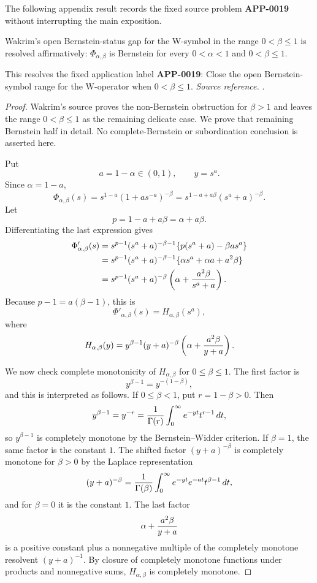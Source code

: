 The following appendix result records the fixed source problem \textbf{APP-0019} without interrupting the main exposition.
\begin{corollary}
\label{res:wakrim-w-operator-bf-gap-solved}
Wakrim's open Bernstein-status gap for the W-symbol in the range \(0<\beta\le1\) is resolved affirmatively: \(\Phi_{\alpha,\beta}\) is Bernstein for every \(0<\alpha<1\) and \(0<\beta\le1\).

This resolves the fixed application label \textbf{APP-0019}: Close the open Bernstein-symbol range for the W-operator when \(0<\beta\le1\).
\emph{Source reference.} \cite{app-app-0019-source}.
\end{corollary}
\begin{proof}
Wakrim's source proves the non-Bernstein obstruction for \(\beta>1\) and
leaves the range \(0<\beta\le1\) as the remaining delicate case.  We prove
that remaining Bernstein half in detail.  No complete-Bernstein or
subordination conclusion is asserted here.

Put
\[
  a=1-\alpha\in(0,1),\qquad y=s^a .
\]
Since \(\alpha=1-a\),
\[
 \Phi_{\alpha,\beta}(s)
 =s^{1-a}(1+a s^{-a})^{-\beta}
 =s^{1-a+a\beta}(s^a+a)^{-\beta}.
\]
Let
\[
  p=1-a+a\beta=\alpha+a\beta .
\]
Differentiating the last expression gives
\[
\begin{aligned}
 \Phi'_{\alpha,\beta}(s)
 &=s^{p-1}(s^a+a)^{-\beta-1}
     \{p(s^a+a)-\beta a s^a\}  \\
 &=s^{p-1}(s^a+a)^{-\beta-1}
     \{\alpha s^a+\alpha a+a^2\beta\}       \\
 &=s^{p-1}(s^a+a)^{-\beta}
     \left(\alpha+{a^2\beta\over s^a+a}\right).
\end{aligned}
\]
Because \(p-1=a(\beta-1)\), this is
\[
  \Phi'_{\alpha,\beta}(s)=H_{\alpha,\beta}(s^a),
\]
where
\[
 H_{\alpha,\beta}(y)
 =y^{\beta-1}(y+a)^{-\beta}
      \left(\alpha+{a^2\beta\over y+a}\right).
\]

We now check complete monotonicity of \(H_{\alpha,\beta}\) for
\(0\le\beta\le1\).  The first factor is
\[
  y^{\beta-1}=y^{-(1-\beta)},
\]
and this is interpreted as follows.  If \(0\le\beta<1\), put
\(r=1-\beta>0\).  Then
\[
  y^{\beta-1}=y^{-r}
  ={1\over\Gamma(r)}
    \int_0^\infty e^{-yt}t^{r-1}\,dt,
\]
so \(y^{\beta-1}\) is completely monotone by the Bernstein--Widder
criterion.  If \(\beta=1\), the same factor is the constant \(1\).  The shifted factor
\((y+a)^{-\beta}\) is completely monotone for \(\beta>0\) by the Laplace
representation
\[
 (y+a)^{-\beta}
 ={1\over\Gamma(\beta)}
   \int_0^\infty e^{-yt}e^{-at}t^{\beta-1}\,dt,
\]
and for \(\beta=0\) it is the constant \(1\).  The last factor
\[
  \alpha+{a^2\beta\over y+a}
\]
is a positive constant plus a nonnegative multiple of the completely monotone
resolvent \((y+a)^{-1}\).  By closure of completely monotone functions under
products and nonnegative sums, \(H_{\alpha,\beta}\) is completely monotone.


\end{proof}
